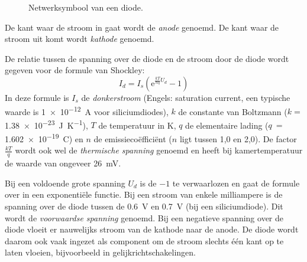 \begin{figure}[!ht]
\centering
{}
\caption{Netwerksymbool van een diode.}
\label{fig:gelsymbooldiode}
\end{figure}

De kant waar de stroom in gaat wordt de \textsl{anode} genoemd. De kant waar de stroom uit komt wordt \textsl{kathode} genoemd.

De relatie tussen de spanning over de diode en de stroom door de diode wordt gegeven voor de formule van Shockley:
%
\begin{equation}
I_d = I_s \left(\mathrm{e}^{\frac{kT}{nq}U_d}-1\right)
\end{equation}
%
In deze formule is $I_s$ de \textsl{donkerstroom} (Engels: saturation current, een typische waarde is \SI{1e-12}{\ampere} voor siliciumdiodes), $k$ de constante van Boltzmann ($k = $ \SI{1.38e-23}{\joule\per\kelvin}), $T$ de temperatuur in \si{\kelvin}, $q$ de elementaire lading ($q~=~$\SI{1.602e-19}{\coulomb}) en $n$ de emissieco\"effici\"ent ($n$ ligt tussen 1,0 en 2,0). De factor $\frac{kT}{q}$ wordt ook wel de \textsl{thermische spanning} genoemd en heeft bij kamertemperatuur de waarde van ongeveer \SI{26}{\milli\volt}.

Bij een voldoende grote spanning $U_d$ is de $-1$ te verwaarlozen en gaat de formule over in een exponenti\"ele functie. Bij een stroom van enkele milliampere is de spanning over de diode tussen de \SI{0.6}{\volt} en \SI{0.7}{\volt} (bij een siliciumdiode). Dit wordt de \textsl{voorwaardse spanning} genoemd. Bij een negatieve spanning over de diode vloeit er nauwelijks stroom van de kathode naar de anode. De diode wordt daarom ook vaak ingezet als component om de stroom slechts \'e\'en kant op te laten vloeien, bijvoorbeeld in gelijkrichtschakelingen.

